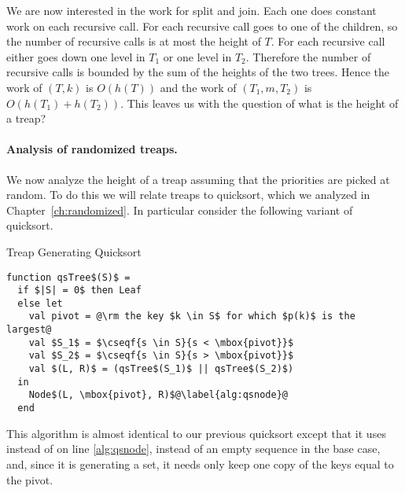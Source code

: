 \begin{comment}
\begin{lemma}
\label{thm:treapuniqueness}
  For a set of keys $S$, if their priorities $p(s) : s \in S$ are unique,
  then there is exactly one treap (i.e. shape) for $S$.

\begin{proof} (By induction on size)
An empty tree is a leaf (base case).  Otherwise, the unique key $k$
with the highest priority in $S$ must be at the root.  This fixes the
keys to the left ($\csetf{k' \in S}{k' < k}$) and to the right
($\csetf{k' \in S}{k' > k}$).  By induction these are unique, so the
whole tree is unique.
\end{proof}
\end{lemma}
\end{comment}

We are now interested in the work for split and join.  Each one does
constant work on each recursive call.  For  each
recursive call goes to one of the children, so the number of recursive
calls is at most the height of $T$.  For  each recursive
call either goes down one level in $T_1$ or one level in $T_2$.
Therefore the number of recursive calls is bounded by the sum of the
heights of the two trees.  Hence the work of $(T,k)$ is
$O(h(T))$ and the work of $(T_1,m,T_2)$ is
$O(h(T_1)+h(T_2))$.  This leaves us with the question of what is the
height of a treap?

\paragraph{Analysis of randomized treaps.}   We now analyze the height
of a treap assuming that the priorities are picked at random.     To
do this we will relate treaps to quicksort, which we analyzed in
Chapter~\ref{ch:randomized}.
In particular consider the following variant of quicksort.
\begin{algorithm}{Treap Generating Quicksort}~
\begin{lstlisting}
function qsTree$(S)$ =
  if $|S| = 0$ then Leaf
  else let
    val pivot = @\rm the key $k \in S$ for which $p(k)$ is the largest@
    val $S_1$ = $\cseqf{s \in S}{s < \mbox{pivot}}$
    val $S_2$ = $\cseqf{s \in S}{s > \mbox{pivot}}$
    val $(L, R)$ = (qsTree$(S_1)$ || qsTree$(S_2)$)
  in
    Node$(L, \mbox{pivot}, R)$@\label{alg:qsnode}@
  end
\end{lstlisting}
\end{algorithm}
This algorithm is almost identical to our previous quicksort except that it
uses  instead of  on line \ref{alg:qsnode},
 instead of an empty sequence in the base case, and, since
it is generating a set, it needs only keep one copy of the keys equal
to the pivot.

